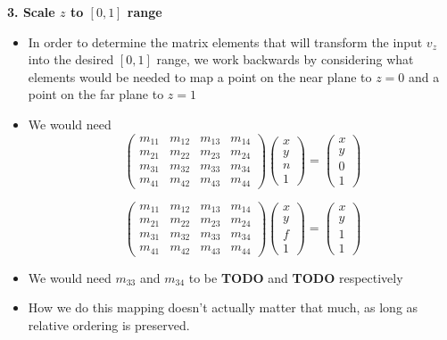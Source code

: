 \documentclass{article}
\begin{document}
\textbf{3. Scale $z$ to $[0,1]$ range}
\begin{itemize}
	\item In order to determine the matrix elements that will transform the input $v_z$ into the desired $[0,1]$ range, we work backwards by considering what elements would be needed to map a point on the near plane to $z = 0$ and a point on the far plane to $z = 1$
	\item  We would need
\[
\begin{pmatrix}
m_{11} & m_{12} & m_{13} & m_{14} \\
m_{21} & m_{22} & m_{23} & m_{24} \\
m_{31} & m_{32} & m_{33} & m_{34} \\
m_{41} & m_{42} & m_{43} & m_{44}
\end{pmatrix}%
\begin{pmatrix}
x \\ y \\ n \\ 1
\end{pmatrix}
=
\begin{pmatrix}
x\\y\\0\\1
\end{pmatrix}
\]

\[
\begin{pmatrix}
m_{11} & m_{12} & m_{13} & m_{14} \\
m_{21} & m_{22} & m_{23} & m_{24} \\
m_{31} & m_{32} & m_{33} & m_{34} \\
m_{41} & m_{42} & m_{43} & m_{44}
\end{pmatrix}%
\begin{pmatrix}
x \\ y \\ f \\ 1
\end{pmatrix}
=
\begin{pmatrix}
x\\y\\1\\1
\end{pmatrix}
\]

\item We would need $m_{33}$ and $m_{34}$ to be \textbf{TODO} and \textbf{TODO} respectively

\item How we do this mapping doesn't actually matter that much, as long as relative ordering is preserved. 
\end{itemize}
\end{document}
